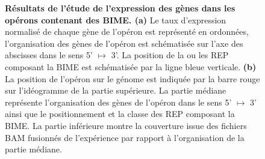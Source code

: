 \documentclass[12pt,a4paper]{report}
\begin{document}
\begin{onehalfspace}
\begin{figure}[ht]
\centering
{}
\caption{\textbf{Résultats de l'étude de l'expression des gènes dans les opérons contenant des BIME. (a)} Le taux d'expression normalisé de chaque gène de l'opéron est représenté en ordonnées, l'organisation des gènes de l'opéron est schématisée sur l'axe des abscisses dans le sens 5' $\mapsto$ 3'. La position de la ou les REP composant la BIME est schématisée par la ligne bleue verticale. \textbf{(b)} La position de l'opéron sur le génome est indiquée par la barre rouge sur l'idéogramme de la partie supérieure. La partie médiane représente l'organisation des gènes de l'opéron dans le sens 5' $\mapsto$ 3' ainsi que le positionnement et la classe des REP composant la BIME. La partie inférieure montre la couverture issue des fichiers BAM fusionnés de l'expérience par rapport à l'organisation de la partie médiane.}
\label{fig:expression} 
\end{figure}


\end{onehalfspace}
\end{document}
